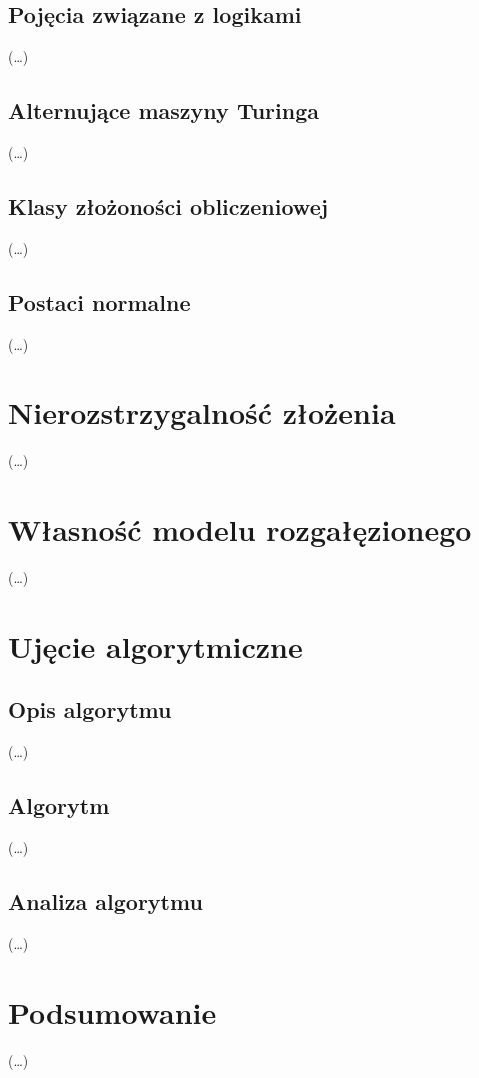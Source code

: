 \documentclass[a4paper]{article}
\begin{document}
\subsection{Pojęcia związane z logikami}
(\dots)
\subsection{Alternujące maszyny Turinga}
(\dots)
\subsection{Klasy złożoności obliczeniowej}
(\dots)
\subsection{Postaci normalne}
(\dots)
\section{Nierozstrzygalność złożenia}\label{nierozstrzygalnosc-zlozenia}
(\dots)
\section{Własność modelu rozgałęzionego}\label{rozstrzygalnosc-fo2}
(\dots)
\section{Ujęcie algorytmiczne}\label{algorytm}
\subsection{Opis algorytmu}
(\dots)
\subsection{Algorytm}
(\dots)
\subsection{Analiza algorytmu}
(\dots)
\section{Podsumowanie}
(\dots)
\end{document}
